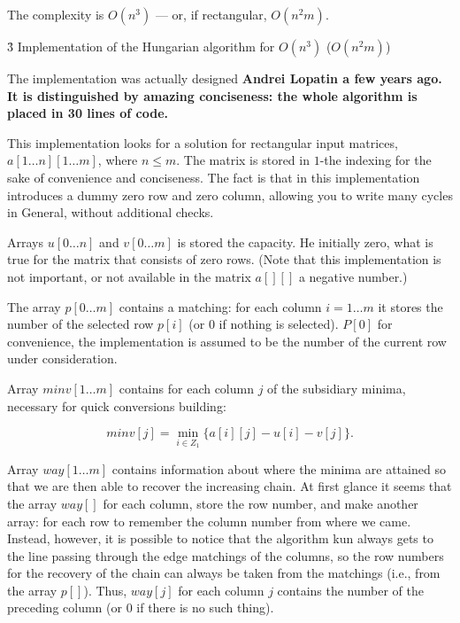 The complexity is $O(n^3)$ --- or, if rectangular, $O(n^2 m)$.


\h3{ Implementation of the Hungarian algorithm for $O(n^3)$ ($O(n^2 m)$) }

The implementation was actually designed \bf{Andrei Lopatin} a few years ago. It is distinguished by amazing conciseness: the whole algorithm is placed in \bf{30 lines of code}.

This implementation looks for a solution for rectangular input matrices, $a[1 \ldots n][1 \ldots m]$, where $n \le m$. The matrix is stored in $1$-the indexing for the sake of convenience and conciseness. The fact is that in this implementation introduces a dummy zero row and zero column, allowing you to write many cycles in General, without additional checks.

Arrays $u[0 \ldots n]$ and $v[0 \ldots m]$ is stored the capacity. He initially zero, what is true for the matrix that consists of zero rows. (Note that this implementation is not important, or not available in the matrix $a[][]$ a negative number.)

The array $p[0 \ldots m] $ contains a matching: for each column $i = 1 \ldots m$ it stores the number of the selected row $p[i]$ (or $0$ if nothing is selected). $P[0]$ for convenience, the implementation is assumed to be the number of the current row under consideration.

Array $minv[1 \ldots m]$ contains for each column $j$ of the subsidiary minima, necessary for quick conversions building:

$$ minv[j] = \min_{i \in Z_1} \{ a[i][j] - u[i] - v[j] \}. $$

Array $way[1 \ldots m]$ contains information about where the minima are attained so that we are then able to recover the increasing chain. At first glance it seems that the array $way[]$ for each column, store the row number, and make another array: for each row to remember the column number from where we came. Instead, however, it is possible to notice that the algorithm kun always gets to the line passing through the edge matchings of the columns, so the row numbers for the recovery of the chain can always be taken from the matchings (i.e., from the array $p[]$). Thus, $way[j]$ for each column $j$ contains the number of the preceding column (or $0$ if there is no such thing).

